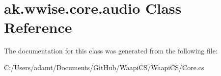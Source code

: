 \hypertarget{classak_1_1wwise_1_1core_1_1audio}{}\section{ak.\+wwise.\+core.\+audio Class Reference}
\label{classak_1_1wwise_1_1core_1_1audio}


The documentation for this class was generated from the following file\+:\begin{DoxyCompactItemize}
\item 
C\+:/\+Users/adamt/\+Documents/\+Git\+Hub/\+Waapi\+C\+S/\+Waapi\+C\+S/Core.\+cs\end{DoxyCompactItemize}
